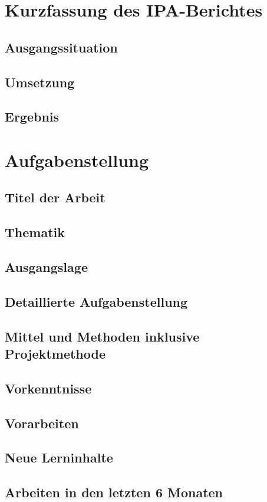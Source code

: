 \documentclass{report}
\begin{document}
\chapter{Kurzfassung des IPA-Berichtes}
\section{Ausgangssituation}
\section{Umsetzung}
\section{Ergebnis}

\tableofcontents



\chapter{Aufgabenstellung}
\section{Titel der Arbeit}
\section{Thematik}
\section{Ausgangslage}
\section{Detaillierte Aufgabenstellung}
\section{Mittel und Methoden inklusive Projektmethode}
\section{Vorkenntnisse}
\section{Vorarbeiten}
\section{Neue Lerninhalte}
\section{Arbeiten in den letzten 6 Monaten}
\end{document}
